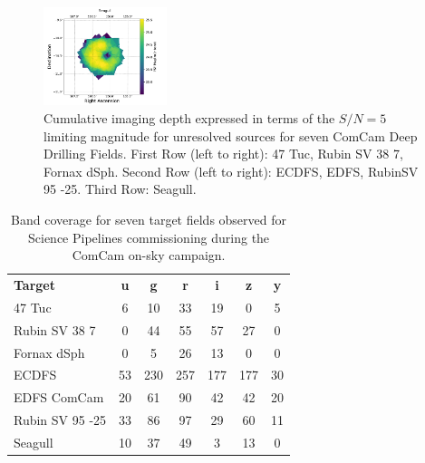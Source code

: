 \begin{figure}
\begin{center}
        \includegraphics[width=0.32\textwidth]{observations_figures/comcam_psf_maglim_seagull_r.pdf}
    \end{center}
    \caption{Cumulative imaging depth expressed in terms of the $S/N=5$ limiting magnitude for unresolved sources for seven ComCam Deep Drilling Fields.
    First Row (left to right): 47 Tuc, Rubin SV 38 7, Fornax dSph.
    Second Row (left to right): ECDFS, EDFS, RubinSV 95 -25.
    Third Row: Seagull.}
    \label{fig:comcam_ddf_psf_maglim}
\end{figure}



\begin{table}
    \centering
    \begin{tabular}{@{}lcccccc@{}}
    \textbf{Target} & \textbf{u} & \textbf{g} & \textbf{r} & \textbf{i} & \textbf{z} & \textbf{y} \\
    47 Tuc          &	     6 & 	10 &	33 &	19 &	 0 &     5 \\
    Rubin SV 38 7 	&       0 &    44 & 	55 &	57 &    27 &     0 \\
    Fornax dSph 	&       0 &	 5 &	26 &	13 &	 0 &	 0 \\
    ECDFS 	        &      53 &   230 &   257 &   177 &   177 &	30 \\
    EDFS ComCam 	&      20 &	61 & 	90 &	42 &	42 &	20 \\
    Rubin SV 95 -25 & 	    33 &	86 &	97 &	29 &	60 &	11 \\
    Seagull 	    &      10 &	37 &   	49 &	3  & 	13 & 	 0 \\
    \end{tabular}
    \caption{Band coverage for seven target fields observed for Science Pipelines commissioning during the ComCam on-sky campaign.}
    \label{tab:target_fields_band_coverage}
\end{table}

